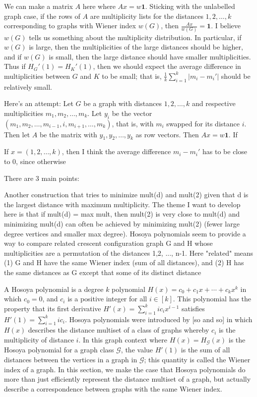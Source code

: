 \documentclass[12]{article}
\theoremstyle{definition}
\begin{document}
	We can make a matrix $A$ here where $Ax = w \mathbf{1}$.  Sticking with the unlabelled graph case, if the rows of $A$ are multiplicity lists for the distances $1, 2, \ldots, k$ corresponding to graphs with Wiener index $w(G)$, then $\tfrac{Ax}{w(G)} = \mathbf{1}$.  I believe $w(G)$ tells us something about the multiplicity distribution.  In particular, if $w(G)$ is large, then the multiplicities of the large distances should be higher, and if $w(G)$ is small, then the large distance should have smaller multiplicities.  Thus if $H_G'(1) = H_K'(1)$, then we should expect the average difference in multiplicities between $G$ and $K$ to be small; that is, $\tfrac{1}{k}\sum_{i=1}^k |m_i - m_i'|$ should be relatively small.  
	
	
	Here's an attempt:  Let $G$ be a graph with distances $1, 2, \ldots, k$ and respective multiplicities $m_1, m_2, \ldots, m_k$.  Let $y_i$ be the vector $(m_1, m_2, \ldots, m_{i-1}, i, m_{i+1}, \ldots, m_k)$, that is, with $m_i$ swapped for its distance $i$.  Then let $A$ be the matrix with $y_1, y_2, \ldots, y_k$ as row vectors.  Then $Ax = w \mathbf{1}$.  If 
	
	If $x = (1, 2, \ldots, k)$, then I think the average difference $m_i - m_i'$ has to be close to $0$, since otherwise
	
	
	There are 3 main points:
	
	Another construction that tries to minimize mult(d) and mult(2) given that d is the largest distance with maximum multiplicity.  The theme I want to develop here is that if mult(d) = max mult, then mult(2) is very close to mult(d) and minimizing mult(d) can often be achieved by minimizing mult(2) (fewer large degree vertices and smaller max degree).
	Hosoya polynomials seem to provide a way to compare related crescent configuration graph G and H whose multiplicities are a permutation of the distances 1,2, ..., n-1.  Here "related" means (1) G and H have the same Wiener index (sum of all distances), and (2) H has the same distances as G except that some of its distinct distance
	
	
	
	
	A Hosoya polynomial is a degree $k$ polynomial $H(x) = c_0 + c_1x + \cdots + c_kx^k$ in which $c_0 = 0$, and $c_i$ is a positive integer for all $i \in [k]$. This polynomial has the property that its first derivative $H'(x) = \sum_{i=1}^{k}ic_ix^{i-1}$ satisfies $H'(1) = \sum_{i=1}^{k} ic_i$.  Hosoya polynomials were introduced by [so and so] in which $H(x)$ describes the distance multiset of a class of graphs whereby $c_i$ is the multiplicity of distance $i$.  In this graph context where $H(x) = H_\mathcal{G}(x)$ is the Hosoya polynomial for a graph class $\mathcal{G}$, the value $H'(1)$ is the sum of all distances between the vertices in a graph in $\mathcal{G}$; this quantity is called the Wiener index of a graph.  In this section, we make the case that Hosoya polynomials do more than just efficiently represent the distance multiset of a graph, but actually describe a correspondence between graphs with the same Wiener index.
	
\end{document}
